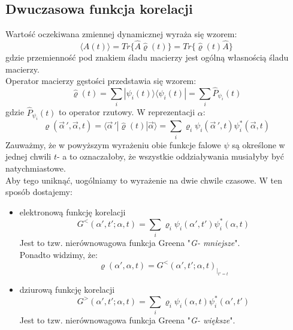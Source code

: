 \subsection{Dwuczasowa funkcja korelacji}
Wartość oczekiwana zmiennej dynamicznej wyraża się wzorem:
\begin{equation}\langle A(t)\rangle=Tr\lbrace\hat{A}\hat{\varrho}(t)\rbrace=
Tr\lbrace\hat{\varrho}(t)\hat{A}\rbrace
\end{equation}
gdzie przemienność pod znakiem śladu macierzy jest ogólną własnością śladu macierzy.\\
Operator macierzy gęstości przedstawia się wzorem:
\begin{equation}\hat{\varrho}(t)=\sum_i|\psi_i(t)\rangle\langle\psi_i(t)|=\sum_i\hat{P}_{\psi_i}(t)\end{equation}
gdzie $\hat{P}_{\psi_i}(t)$ to operator rzutowy.
W reprezentacji $\alpha$:
\begin{equation}\varrho(\vec{\alpha}\,',\vec{\alpha},t)=
\langle \vec{\alpha}\,'|\hat{\varrho}(t)|\vec{\alpha}\rangle=\sum_i \varrho_i\psi_i(\vec{\alpha}\,',t)\psi_i^*(\vec{\alpha},t)
\end{equation}
Zauważmy, że w powyższym wyrażeniu obie funkcje falowe $\psi$ są określone w jednej chwili $t$- a to oznaczałoby, że wszystkie oddziaływania musiałyby być natychmiastowe.\\
Aby tego uniknąć, uogólniamy to wyrażenie na dwie chwile czasowe. W ten sposób dostajemy:
\begin{itemize}
\item elektronową funkcję korelacji
\begin{equation}G^<(\alpha',t';\alpha,t)=
\sum_i\varrho_i\psi_i(\alpha',t')\psi_i^*(\alpha,t)
\end{equation}
Jest to tzw. nierównowagowa funkcja Greena "\textit{G- mniejsze}".\\
Ponadto widzimy, że:
\begin{equation}\varrho(\alpha',\alpha,t)=G^<(\alpha',t';\alpha,t)_{|_{t'=t}}
\end{equation}
\item dziurową funkcję korelacji
\begin{equation}G^>(\alpha',t';\alpha,t)=
\sum_i\varrho_i\psi_i(\alpha,t)\psi_i^*(\alpha',t')
\end{equation}
Jest to tzw. nierównowagowa funkcja Greena "\textit{G- większe}".
\end{itemize}
